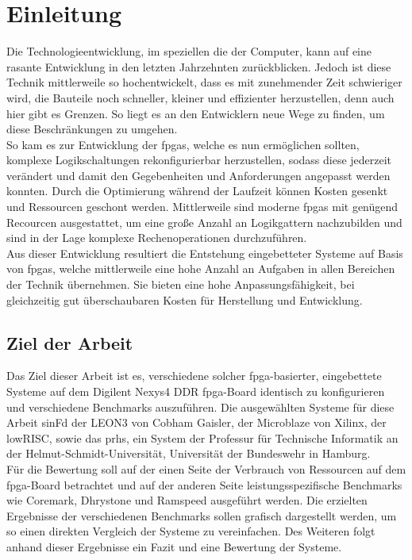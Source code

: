 \chapter{Einleitung}\label{ch:einleitung}

Die Technologieentwicklung, im speziellen die der Computer, kann auf eine rasante Entwicklung in den letzten
Jahrzehnten zurückblicken. Jedoch ist diese Technik mittlerweile so hochentwickelt, dass es mit zunehmender Zeit
schwieriger wird, die Bauteile noch schneller, kleiner und effizienter herzustellen, denn auch hier gibt es Grenzen.
So liegt es an den Entwicklern neue Wege zu finden, um diese Beschränkungen zu umgehen. \\
So kam es zur Entwicklung der \acp{fpga}, welche es nun ermöglichen sollten, komplexe Logikschaltungen
rekonfigurierbar herzustellen, sodass diese jederzeit verändert und damit den Gegebenheiten und
Anforderungen angepasst werden konnten. Durch die Optimierung während der Laufzeit können Kosten gesenkt und
Ressourcen geschont werden. Mittlerweile sind moderne \acp{fpga} mit genügend Recourcen ausgestattet, um eine
große Anzahl an Logikgattern nachzubilden und sind in der Lage komplexe Rechenoperationen durchzuführen.\\
Aus dieser Entwicklung resultiert die Entstehung eingebetteter Systeme auf Basis von \acp{fpga}, welche mittlerweile eine hohe Anzahl an Aufgaben in allen Bereichen der Technik übernehmen.
Sie bieten eine hohe Anpassungsfähigkeit, bei gleichzeitig gut überschaubaren Kosten für Herstellung und Entwicklung.\\

\section{Ziel der Arbeit}\label{kap:zielderarbeit}

Das Ziel dieser Arbeit ist es, verschiedene solcher \ac{fpga}-basierter, eingebettete Systeme auf dem Digilent Nexys4 DDR \ac{fpga}-Board identisch zu konfigurieren und verschiedene Benchmarks auszuführen.
Die ausgewählten Systeme für diese Arbeit sinFd der LEON3 von Cobham Gaisler, der Microblaze von Xilinx, der lowRISC, sowie das \ac{prhs}, ein System der
Professur für Technische Informatik an der Helmut-Schmidt-Universität, Universität der Bundeswehr in Hamburg.\\
Für die Bewertung soll auf der einen Seite der Verbrauch von Ressourcen auf dem \ac{fpga}-Board betrachtet und auf der anderen Seite leistungsspezifische Benchmarks
wie Coremark, Dhrystone und Ramspeed ausgeführt werden. Die erzielten Ergebnisse der verschiedenen Benchmarks sollen
grafisch dargestellt werden, um so einen direkten Vergleich der Systeme zu vereinfachen. Des Weiteren folgt anhand dieser Ergebnisse ein Fazit und eine
Bewertung der Systeme.\\


